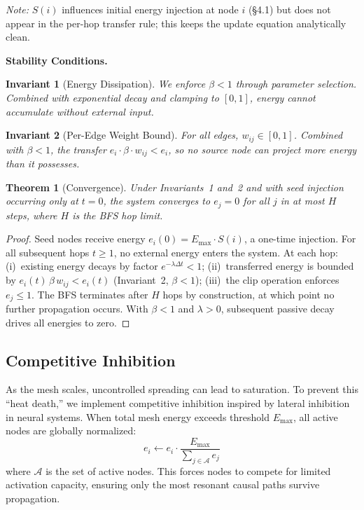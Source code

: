 \documentclass[11pt]{article}
\newtheorem{theorem}{Theorem}
\newtheorem{invariant}{Invariant}
\begin{document}
\textit{Note:} $S(i)$ influences initial energy injection at node $i$
(\S4.1) but does not appear in the per-hop transfer rule; this keeps the
update equation analytically clean.

\textbf{Stability Conditions.}

\begin{invariant}[Energy Dissipation]
We enforce $\beta < 1$ through parameter selection. Combined with
exponential decay and clamping to $[0,1]$, energy cannot accumulate
without external input.
\end{invariant}

\begin{invariant}[Per-Edge Weight Bound]
For all edges, $w_{ij} \in [0,1]$. Combined with $\beta < 1$, the
transfer $e_i \cdot \beta \cdot w_{ij} < e_i$, so no source node can
project more energy than it possesses.
\end{invariant}

\begin{theorem}[Convergence]\label{thm:convergence}
Under Invariants~1 and~2 and with seed injection occurring only at
$t=0$, the system converges to $e_j = 0$ for all $j$ in at most $H$
steps, where $H$ is the BFS hop limit.
\end{theorem}

\begin{proof}
Seed nodes receive energy $e_i(0) = E_{\max} \cdot S(i)$, a one-time
injection. For all subsequent hops $t \ge 1$, no external energy enters
the system. At each hop: (i)~existing energy decays by factor
$e^{-\lambda\Delta t} < 1$; (ii)~transferred energy is bounded by
$e_i(t)\,\beta\,w_{ij} < e_i(t)$ (Invariant~2, $\beta < 1$);
(iii)~the clip operation enforces $e_j \le 1$. The BFS terminates after
$H$ hops by construction, at which point no further propagation occurs.
With $\beta < 1$ and $\lambda > 0$, subsequent passive decay drives all
energies to zero.
\end{proof}

\subsection{Competitive Inhibition}

As the mesh scales, uncontrolled spreading can lead to saturation. To
prevent this ``heat death,'' we implement competitive inhibition
inspired by lateral inhibition in neural systems. When total mesh energy
exceeds threshold $E_{\max}$, all active nodes are globally normalized:
\begin{equation}
  e_i \leftarrow e_i \cdot \frac{E_{\max}}{\displaystyle\sum_{j \in \mathcal{A}} e_j}
\end{equation}
where $\mathcal{A}$ is the set of active nodes. This forces nodes to
compete for limited activation capacity, ensuring only the most resonant
causal paths survive propagation.
\end{document}
